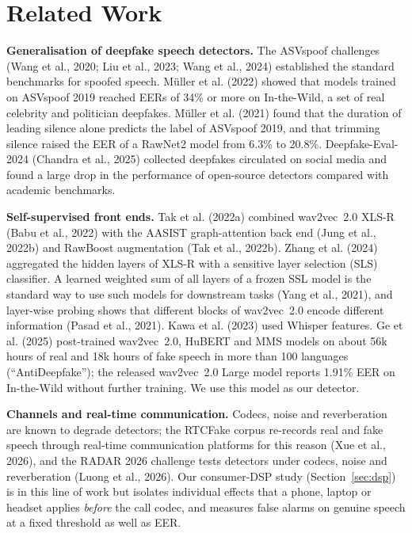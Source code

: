 \documentclass[10pt,a4paper,twocolumn]{article}
\begin{document}
\section{Related Work}
\textbf{Generalisation of deepfake speech detectors.} The ASVspoof challenges (Wang et al., 2020; Liu et al., 2023; Wang et al., 2024) established the standard benchmarks for spoofed speech. M\"uller et al. (2022) showed that models trained on ASVspoof 2019 reached EERs of 34\% or more on In-the-Wild, a set of real celebrity and politician deepfakes. M\"uller et al. (2021) found that the duration of leading silence alone predicts the label of ASVspoof 2019, and that trimming silence raised the EER of a RawNet2 model from 6.3\% to 20.8\%. Deepfake-Eval-2024 (Chandra et al., 2025) collected deepfakes circulated on social media and found a large drop in the performance of open-source detectors compared with academic benchmarks.

\textbf{Self-supervised front ends.} Tak et al. (2022a) combined wav2vec~2.0 XLS-R (Babu et al., 2022) with the AASIST graph-attention back end (Jung et al., 2022b) and RawBoost augmentation (Tak et al., 2022b). Zhang et al. (2024) aggregated the hidden layers of XLS-R with a sensitive layer selection (SLS) classifier. A learned weighted sum of all layers of a frozen SSL model is the standard way to use such models for downstream tasks (Yang et al., 2021), and layer-wise probing shows that different blocks of wav2vec~2.0 encode different information (Pasad et al., 2021). Kawa et al. (2023) used Whisper features. Ge et al. (2025) post-trained wav2vec~2.0, HuBERT and MMS models on about 56k hours of real and 18k hours of fake speech in more than 100 languages (``AntiDeepfake''); the released wav2vec~2.0 Large model reports 1.91\% EER on In-the-Wild without further training. We use this model as our detector.

\textbf{Channels and real-time communication.} Codecs, noise and reverberation are known to degrade detectors; the RTCFake corpus re-records real and fake speech through real-time communication platforms for this reason (Xue et al., 2026), and the RADAR 2026 challenge tests detectors under codecs, noise and reverberation (Luong et al., 2026). Our consumer-DSP study (Section~\ref{sec:dsp}) is in this line of work but isolates individual effects that a phone, laptop or headset applies \emph{before} the call codec, and measures false alarms on genuine speech at a fixed threshold as well as EER.
\end{document}
